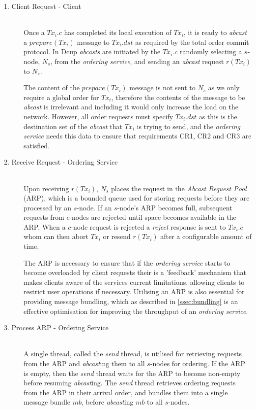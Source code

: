 	\begin{description}
		\item[1. Client Request - Client] \hfill \\
		Once a $Tx_i.c$ has completed its local execution of $Tx_i$, it is ready to \emph{abcast} a $prepare(Tx_i)$ message to $Tx_i.dst$ as required by the total order commit protocol.  In \textsf{Dcup} \emph{abcasts} are initiated by the $Tx_i.c$ randomly selecting a $s$-node, $N_s$, from the \emph{ordering service}, and sending an \emph{abcast} request $r(Tx_i)$ to $N_s$.  
		
		The content of the $prepare(Tx_i)$ message is not sent to $N_s$ as we only require a global order for $Tx_i$, therefore the contents of the message to be \emph{abcast} is irrelevant and including it would only increase the load on the network.  However, all order requests must specify $Tx_i.dst$ as this is the destination set of the \emph{abcast} that $Tx_i$ is trying to send, and the \emph{ordering service} needs this data to ensure that requirements CR1, CR2 and CR3 are satisfied.  
		
		\item[2. Receive Request - Ordering Service] \hfill \\
		Upon receiving $r(Tx_i)$, $N_s$ places the request in the \emph{Abcast Request Pool} (ARP), which is a bounded queue used for storing requests before they are processed by an $s$-node.  If an $s$-node's ARP becomes full, subsequent requests from $c$-nodes are rejected until space becomes available in the ARP.  When a $c$-node request is rejected a \emph{reject} response is sent to $Tx_i.c$ whom can then abort $Tx_i$ or resend $r(Tx_i)$ after a configurable amount of time.    
		
		The ARP is necessary to ensure that if the \emph{ordering service} starts to become overloaded by client requests their is a 'feedback' mechanism that makes clients aware of the services current limitations, allowing clients to restrict user operations if necessary.  Utilising an ARP is also essential for providing message bundling, which as described in \ref{ssec:bundling} is an effective optimisation for improving the throughput of an \emph{ordering service}.  
		
		\item[3. Process ARP - Ordering Service] \hfill \\
		A single thread, called the \emph{send} thread, is utilised for retrieving requests from the ARP and \emph{abcast}ing them to all $s$-nodes for ordering.  If the ARP is empty, then the \emph{send} thread waits for the ARP to become non-empty before resuming \emph{abcast}ing.  The \emph{send} thread retrieves ordering requests from the ARP in their arrival order, and bundles them into a single message bundle $mb$, before \emph{abcast}ing $mb$ to all $s$-nodes.  
		

\end{description}
